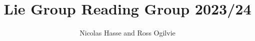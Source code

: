 \documentclass[twoside,11pt,a4paper,leqno]{article}
\numberwithin{equation}{section}
\theoremstyle{plain}
\theoremstyle{definition}
\begin{document}
\title{Lie Group Reading Group 2023/24}
\author{Nicolas Hasse and Ross Ogilvie}
\maketitle







 

\end{document}
